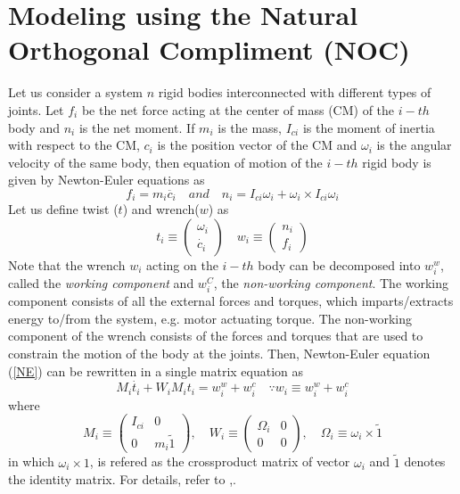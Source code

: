 \section{Modeling using the Natural Orthogonal Compliment (NOC)}
Let us consider a system $n$ rigid bodies interconnected with different types of joints. 
Let $f_i$ be the net force acting at the center of mass (CM) of the $i-th$  body and $n_i$ is the net moment.
 If $m_i$ is the mass, $I_{ci}$ is the  moment of inertia with respect to the CM, $c_i$ is the position vector of the CM and $\omega_i$ is the angular velocity of the same body, then equation of motion of the $i-th$ rigid body is given by Newton-Euler equations as 
\begin{equation}
\label{NE}
f_i=m_i\ddot{c_i} \quad and \quad n_i=I_{ci} \omega_i+\omega_i \times I_{ci} \omega_i
\end{equation}
Let us  define twist ($t$) and wrench($w$) as 
\begin{equation*}
t_i \equiv \begin{pmatrix}
\omega_i\\ \dot{c_i}
\end{pmatrix} \quad
w_i \equiv \begin{pmatrix}
n_i\\f_i
\end{pmatrix}
\end{equation*}
Note that the wrench $w_i$ acting on the $i-th$ body can be decomposed into $w^w_i$, called the \textit{working component} and  $w^C_i$, the \textit{non-working component}.
 The working component consists of all the external  forces and torques, which imparts/extracts energy to/from the system, e.g. motor actuating torque.
  The non-working component of the wrench consists of the forces and torques that are used to constrain the motion of the body at the joints.
Then, Newton-Euler equation (\ref{NE}) can be rewritten  in a single matrix equation as 
\begin{equation}
\label{2}
M_i\dot{t_i}+W_iM_it_i=w^w_i+w^c_i \quad \because w_i \equiv w^w_i+w^c_i
\end{equation}
where
\begin{equation}
\label{3}
M_i \equiv \begin{pmatrix}
I_{ci} & 0\\0 & m_i\tilde{1}
\end{pmatrix} ,
\quad W_i\equiv \begin{pmatrix}
\Omega_i &0\\0&0
\end{pmatrix},
\quad
\Omega_i\equiv \omega_i\times \tilde{1}
\end{equation}
in which  $\omega_i\times 1$, is refered as the crossproduct matrix of vector $\omega_i$ and $\tilde{1}$ denotes the identity matrix.
For details, refer to \cite{angeles2013fundamentals},\cite{saha2010robotics}.


